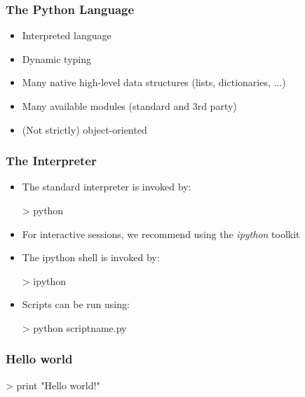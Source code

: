 \documentclass{beamer}
\newenvironment{code}{%
  \begin{exampleblock}{}
      \ttfamily
    }{%
  \end{exampleblock}
}
\begin{document}
\subtitle{Introduction to Python}

\maketitle

\begin{frame}
    \frametitle{The Python Language}
    \begin{itemize}
    \item Interpreted language
    \item Dynamic typing
    \item Many native high-level data structures (lists, dictionaries, ...)
    \item Many available modules (standard and 3rd party)
    \item (Not strictly) object-oriented 
    \end{itemize}
\end{frame}

\begin{frame}
    \frametitle{The Interpreter}
    \begin{itemize}
    \item The standard interpreter is invoked by:
        \begin{code}
            > python
        \end{code}
    \item For interactive sessions, we recommend using the \emph{ipython}
        toolkit
    \item The ipython shell is invoked by:
        \begin{code}
            > ipython
        \end{code}
    \item Scripts can be run using:
        \begin{code}
            > python scriptname.py
        \end{code}
    \end{itemize}
\end{frame}

\begin{frame}
    \frametitle{Hello world}
    \begin{code}
        > print "Hello world!"
    \end{code}
\end{frame}
\end{document}
